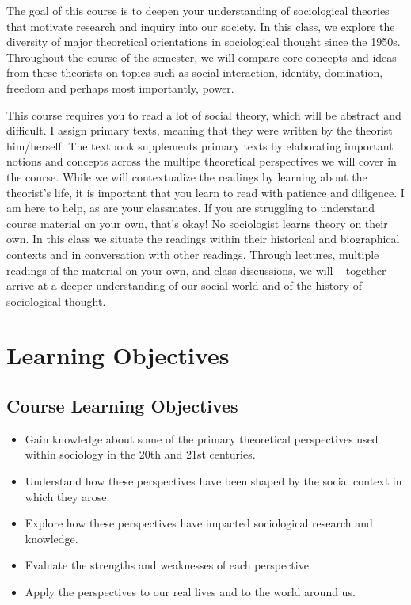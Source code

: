 \documentclass[11pt,]{article}
\providecommand{\tightlist}{%
  \setlength{\itemsep}{0pt}\setlength{\parskip}{0pt}}
\begin{document}
The goal of this course is to deepen your understanding of sociological
theories that motivate research and inquiry into our society. In this
class, we explore the diversity of major theoretical orientations in
sociological thought since the 1950s. Throughout the course of the
semester, we will compare core concepts and ideas from these theorists
on topics such as social interaction, identity, domination, freedom and
perhaps most importantly, power.

This course requires you to read a lot of social theory, which will be
abstract and difficult. I assign primary texts, meaning that they were
written by the theorist him/herself. The textbook supplements primary
texts by elaborating important notions and concepts across the multipe
theoretical perspectives we will cover in the course. While we will
contextualize the readings by learning about the theorist's life, it is
important that you learn to read with patience and diligence. I am here
to help, as are your classmates. If you are struggling to understand
course material on your own, that's okay! No sociologist learns theory
on their own. In this class we situate the readings within their
historical and biographical contexts and in conversation with other
readings. Through lectures, multiple readings of the material on your
own, and class discussions, we will -- together -- arrive at a deeper
understanding of our social world and of the history of sociological
thought.

\hypertarget{learning-objectives}{%
\section{Learning Objectives}\label{learning-objectives}}

\hypertarget{course-learning-objectives}{%
\subsection{Course Learning
Objectives}\label{course-learning-objectives}}

\begin{itemize}
\tightlist
\item
  Gain knowledge about some of the primary theoretical perspectives used
  within sociology in the 20th and 21st centuries.
\item
  Understand how these perspectives have been shaped by the social
  context in which they arose.
\item
  Explore how these perspectives have impacted sociological research and
  knowledge.
\item
  Evaluate the strengths and weaknesses of each perspective.
\item
  Apply the perspectives to our real lives and to the world around us.
\end{itemize}
\end{document}
